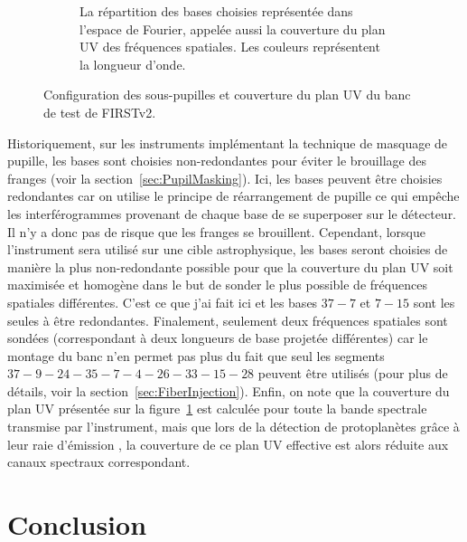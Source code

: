 \begin{figure}[ht!]
\begin{subfigure}{0.59\textwidth}
        \caption{La répartition des bases choisies représentée dans l'espace de Fourier, appelée aussi la couverture du plan UV des fréquences spatiales. Les couleurs représentent la longueur d'onde.}
        \label{fig:SegUVSimuleB}
    \end{subfigure}
    \caption[Configuration des sous-pupilles et couverture du plan UV du banc de test de FIRSTv2.]{Configuration des sous-pupilles et couverture du plan UV du banc de test de FIRSTv2.}
    \label{fig:SegUVSimule}
\end{figure}

Historiquement, sur les instruments implémentant la technique de masquage de pupille, les bases sont choisies non-redondantes pour éviter le brouillage des franges (voir la section~\ref{sec:PupilMasking}). Ici, les bases peuvent être choisies redondantes car on utilise le principe de réarrangement de pupille ce qui empêche les interférogrammes provenant de chaque base de se superposer sur le détecteur. Il n'y a donc pas de risque que les franges se brouillent. Cependant, lorsque l'instrument sera utilisé sur une cible astrophysique, les bases seront choisies de manière la plus non-redondante possible pour que la couverture du plan UV soit maximisée et homogène dans le but de sonder le plus possible de fréquences spatiales différentes. C'est ce que j'ai fait ici et les bases $37-7$ et $7-15$ sont les seules à être redondantes. Finalement, seulement deux fréquences spatiales sont sondées (correspondant à deux longueurs de base projetée différentes) car le montage du banc n'en permet pas plus du fait que seul les segments $37 - 9 - 24 - 35 - 7 - 4 - 26 - 33 - 15 - 28$ peuvent être utilisés (pour plus de détails, voir la section~\ref{sec:FiberInjection}). Enfin, on note que la couverture du plan UV présentée sur la figure~\ref{fig:SegUVSimuleB} est calculée pour toute la bande spectrale transmise par l'instrument, mais que lors de la détection de protoplanètes grâce à leur raie d'émission \ha, la couverture de ce plan UV effective est alors réduite aux canaux spectraux correspondant.


\section{Conclusion}


